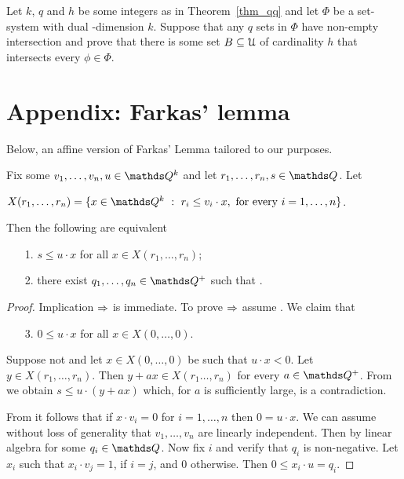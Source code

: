 \documentclass[sputnik.tex]{subfiles}
\begin{document}
\begin{exercise}\label{ex_dual_qqthm}
Let $k$, $q$ and $h$ be some integers as in Theorem~\ref{thm_qq} and let $\Phi$ be a set-system with dual \vc-dimension $k$.
Suppose that any $q$ sets in $\Phi$ have non-empty intersection and prove that there is some set $B\subseteq\EuScript U$ of cardinality $h$ that intersects every $\phi\in\Phi$.\QED
\end{exercise}




\section{Appendix: Farkas' lemma}\label{appendix}

Below, an affine version of Farkas' Lemma tailored to our purposes.

\begin{proposition}
Fix some $v_1,\dots,v_n,u\in\QQ^k$ and let $r_1,\dots,r_n,s\in\QQ$.
Let 

\hfil $X(r_1,\dots,r_n)=\{x\in\QQ^k\ :\ r_i\le v_i\cdot x, \textrm{ for every }i=1,\dots,n\}$.


Then the following are equivalent
\begin{itemize}
\item[1.] $s\le u\cdot x$ for all $x\in X(r_1,\dots,r_n)$;
\item[2.] there exist $q_1,\dots,q_n\in\QQ^+$ such that .
\end{itemize}
\end{proposition}
\begin{proof}
Implication $\Rightarrow$ is immediate.
To prove $\Rightarrow$ assume .
We claim that
\begin{itemize}
\item[3.] $0\le u\cdot x$ for all $x\in X(0,\dots,0)$.
\end{itemize}
Suppose not and let $x\in X(0,\dots,0)$ be such that $u\cdot x<0$.
Let $y\in X(r_1,\dots,r_n)$.
Then $y+ax\in X(r_1\dots,r_n)$ for every $a\in\QQ^+$.
From  we obtain $s\le u\cdot (y+ax)$ which, for $a$ is sufficiently large, is a contradiction.


From  it follows that if $x\cdot v_i=0$ for $i=1,\dots,n$ then $0= u\cdot x$.
We can assume without loss of generality that $v_1,\dots,v_n$ are linearly independent.
Then by linear algebra  for some $q_i\in\QQ$.
Now fix $i$ and verify that $q_i$ is non-negative.
Let $x_i$ such that $x_i\cdot v_j=1$, if $i=j$, and $0$ otherwise.
Then $0\le x_i\cdot u=q_i$.
\end{proof}



 
 
\end{document}
